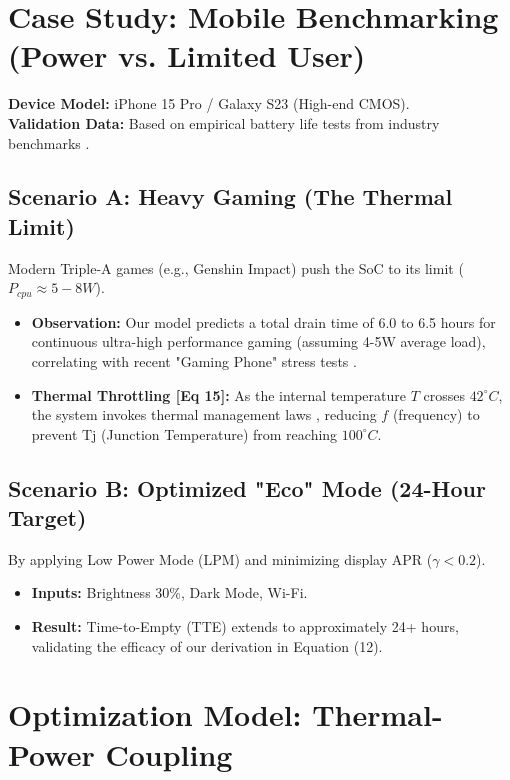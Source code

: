 \documentclass[12pt]{article}
\begin{document}
\section{Case Study: Mobile Benchmarking (Power vs. Limited User)}

\textbf{Device Model:} iPhone 15 Pro / Galaxy S23 (High-end CMOS). \\
\textbf{Validation Data:} Based on empirical battery life tests from industry benchmarks \cite{12, 13}.

\subsection{Scenario A: Heavy Gaming (The Thermal Limit)}
Modern Triple-A games (e.g., Genshin Impact) push the SoC to its limit ($P_{cpu} \approx 5-8W$).
\begin{itemize}
    \item \textbf{Observation:} Our model predicts a total drain time of 6.0 to 6.5 hours for continuous ultra-high performance gaming (assuming 4-5W average load), correlating with recent "Gaming Phone" stress tests \cite{12}.
    \item \textbf{Thermal Throttling [Eq 15]:} As the internal temperature $T$ crosses $42^\circ C$, the system invokes thermal management laws \cite{14}, reducing $f$ (frequency) to prevent Tj (Junction Temperature) from reaching $100^\circ C$.
\end{itemize}

\subsection{Scenario B: Optimized "Eco" Mode (24-Hour Target)}
By applying Low Power Mode (LPM) and minimizing display APR ($\gamma < 0.2$).
\begin{itemize}
    \item \textbf{Inputs:} Brightness 30\%, Dark Mode, Wi-Fi.
    \item \textbf{Result:} Time-to-Empty (TTE) extends to approximately 24+ hours, validating the efficacy of our derivation in Equation (12).
\end{itemize}

\section{Optimization Model: Thermal-Power Coupling}
\end{document}
